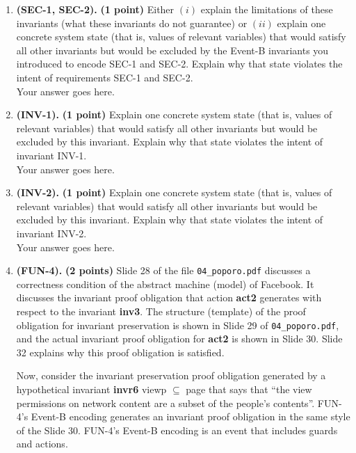 \documentclass{article} %
\newcommand{\ebtag}[1]{\textcolor{pgrey}{\textsf{\bf #1}}}
\newcommand{\ebcode}[1]{\textsf{#1}}
\begin{document}
\begin{enumerate}[leftmargin=*, label=\textbf{Q\arabic*}, itemsep=-5pt]
\item \textbf{(SEC-1, SEC-2).} \textbf{(1 point)} Either $(i)$ explain
  the limitations of these invariants (what these invariants do not guarantee) or $(ii)$
  explain one concrete system state (that is, values of relevant variables) that would satisfy all other invariants but would be excluded by the Event-B invariants you introduced to encode SEC-1 and SEC-2. Explain why that state violates the intent of requirements SEC-1 and SEC-2. \\
  {\color{blue}Your answer goes here. \\
  }
%
\item \textbf{(INV-1).} \textbf{(1 point)} Explain one concrete system state (that is, values of relevant variables) that would satisfy all other invariants but would be excluded by this invariant. Explain why that state violates the intent of invariant {INV-1}. \\ 
  {\color{blue}Your answer goes here.  \\
    }
%
  \item \textbf{(INV-2).} \textbf{(1 point)} Explain one concrete system state (that is, values of relevant variables) that would satisfy all other invariants but would be excluded by this invariant. Explain why that state violates the intent of invariant {INV-2}. \\ 
  {\color{blue}Your answer goes here.  \\
    }
%
  \item \textbf{(FUN-4).} \textbf{(2 points)} Slide 28 of the file \texttt{04\_\-poporo.\-pdf} discusses a correctness condition of the abstract machine (model) of Facebook. It discusses the invariant proof obligation that action \ebtag{act2} generates with respect to the invariant \ebtag{inv3}. The structure (template) of the proof obligation for invariant preservation is shown in Slide 29 of \texttt{04\_\-poporo.\-pdf}, and the actual invariant proof obligation for \ebtag{act2} is shown in Slide 30. Slide 32 explains why this proof obligation is satisfied.

    Now, consider the invariant preservation proof obligation generated by a hypothetical invariant \ebtag{invr6} \ebcode{viewp} $\subseteq$ \ebcode{page} that says that ``the view permissions on network content are a subset of the people's contents''. FUN-4's Event-B encoding generates an invariant proof obligation in the same style of the Slide 30. FUN-4's Event-B encoding is an event that includes guards and actions.


\end{enumerate}
\end{document}
